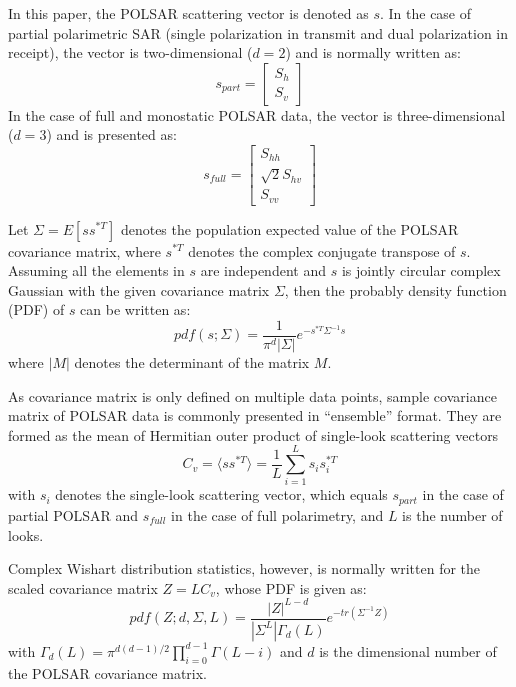 \documentclass[journal]{IEEEtran}
\begin{document}
In this paper, the POLSAR scattering vector is denoted as $s$.
In the case of partial polarimetric SAR (single polarization in transmit and dual polarization in receipt),
  the vector is two-dimensional ($d=2$) and is normally written as: 
\begin{equation}
s_{part}=\begin{bmatrix}
S_h\\ 
S_v
\end{bmatrix}
\end{equation}
In the case of full and monostatic POLSAR data,
  the vector is three-dimensional ($d=3$) and is presented as:
\begin{equation}
s_{full}=\begin{bmatrix}
S_{hh}\\
\sqrt{2}S_{hv}\\
S_{vv}
\end{bmatrix}
\end{equation}

Let $\Sigma=E [ss^{*T}]$ denotes the population expected value of the POLSAR covariance matrix,
  where $s^{*T}$ denotes the complex conjugate transpose of $s$. 
Assuming all the elements in $s$ are independent
  and $s$ is jointly circular complex Gaussian with the given covariance matrix $\Sigma$,
  then the probably density function (PDF) of $s$ can be written as:
\begin{equation}
  pdf(s;\Sigma)=\frac{1}{\pi^d|\Sigma|} e^{-s^{*T}\Sigma^{-1}s}
\end{equation}
where $|M|$ denotes the determinant of the matrix $M$.

As covariance matrix is only defined on multiple data points,
  sample covariance matrix of POLSAR data is commonly presented in ``ensemble'' format.
They are formed as the mean of Hermitian outer product of single-look scattering vectors
\begin{equation}
  C_v = \langle ss^{*T} \rangle = \frac{1}{L} \sum^L_{i=1}s_is_i^{*T}
\end{equation}
with $s_i$ denotes the single-look scattering vector,
  which equals $s_{part}$ in the case of partial POLSAR and
  $s_{full}$ in the case of full polarimetry,
and $L$ is the number of looks.

Complex Wishart distribution statistics, however, is normally written for the scaled covariance matrix
$Z=LC_v$, whose PDF is given as:
\begin{equation}
  pdf(Z;d,\Sigma,L)=\frac{|Z|^{L-d}}{|\Sigma^L|\Gamma_d(L)}e^{-tr(\Sigma^{-1}Z)}
\end{equation}
with $\Gamma_d(L) = \pi^{d(d-1)/2} \prod^{d-1}_{i=0}\Gamma(L-i)$
and $d$ is the dimensional number of the POLSAR covariance matrix.
\end{document}
